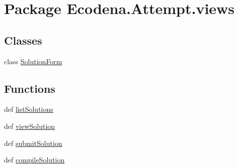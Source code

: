\hypertarget{namespace_ecodena_1_1_attempt_1_1views}{
\section{Package Ecodena.Attempt.views}
\label{d7/d76/namespace_ecodena_1_1_attempt_1_1views}
}
\subsection*{Classes}
\begin{DoxyCompactItemize}
\item 
class \hyperlink{class_ecodena_1_1_attempt_1_1views_1_1_solution_form}{SolutionForm}
\end{DoxyCompactItemize}
\subsection*{Functions}
\begin{DoxyCompactItemize}
\item 
def \hyperlink{namespace_ecodena_1_1_attempt_1_1views_aefcfaf496faa0d0cabd21b6574a78ca2}{listSolutions}
\item 
def \hyperlink{namespace_ecodena_1_1_attempt_1_1views_a5e3b3bf6c3df69f40299ec0669a7a978}{viewSolution}
\item 
def \hyperlink{namespace_ecodena_1_1_attempt_1_1views_a6b656f2fc0947e8cc7ea0d1c1d7564d6}{submitSolution}
\item 
def \hyperlink{namespace_ecodena_1_1_attempt_1_1views_a142f44375d6c0e89c3f335344c602496}{compileSolution}
\end{DoxyCompactItemize}


